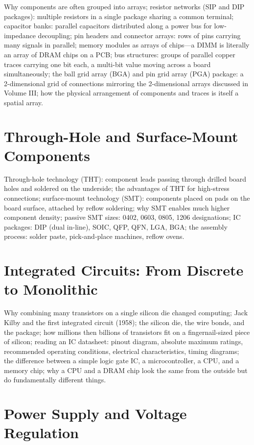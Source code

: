 Why components are often grouped into arrays; resistor networks (SIP and
DIP packages): multiple resistors in a single package sharing a common
terminal; capacitor banks: parallel capacitors distributed along a power
bus for low-impedance decoupling; pin headers and connector arrays: rows
of pins carrying many signals in parallel; memory modules as arrays of
chips---a DIMM is literally an array of DRAM chips on a PCB; bus structures:
groups of parallel copper traces carrying one bit each, a multi-bit value
moving across a board simultaneously; the ball grid array (BGA) and pin
grid array (PGA) package: a 2-dimensional grid of connections mirroring
the 2-dimensional arrays discussed in Volume III; how the physical
arrangement of components and traces is itself a spatial array.

\chapter{Through-Hole and Surface-Mount Components}
\label{ch:component-packages}

Through-hole technology (THT): component leads passing through drilled board
holes and soldered on the underside; the advantages of THT for
high-stress connections; surface-mount technology (SMT): components placed
on pads on the board surface, attached by reflow soldering; why SMT enables
much higher component density; passive SMT sizes: 0402, 0603, 0805, 1206
designations; IC packages: DIP (dual in-line), SOIC, QFP, QFN, LGA, BGA;
the assembly process: solder paste, pick-and-place machines, reflow ovens.

\chapter{Integrated Circuits: From Discrete to Monolithic}
\label{ch:ics-overview}

Why combining many transistors on a single silicon die changed computing;
Jack Kilby and the first integrated circuit (1958); the silicon die,
the wire bonds, and the package; how millions then billions of transistors
fit on a fingernail-sized piece of silicon; reading an IC datasheet: pinout
diagram, absolute maximum ratings, recommended operating conditions,
electrical characteristics, timing diagrams; the difference between a
simple logic gate IC, a microcontroller, a CPU, and a memory chip;
why a CPU and a DRAM chip look the same from the outside but do
fundamentally different things.

\chapter{Power Supply and Voltage Regulation}
\label{ch:power-supply}

